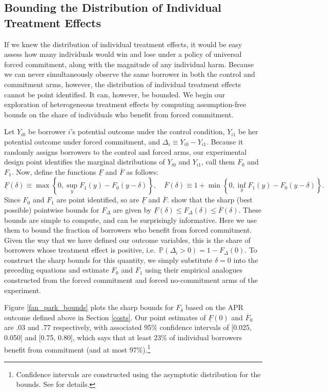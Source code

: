 \documentclass[oneside,11pt]{article}
\begin{document}
\subsection{Bounding the Distribution of Individual Treatment Effects}
\label{sec:bounds}
If we knew the distribution of individual treatment effects, it would be easy assess how many individuals would win and lose under a policy of universal forced commitment, along with the magnitude of any individual harm. 
Because we can never simultaneously observe the same borrower in both the control and commitment arms, however, the distribution of individual treatment effects cannot be point identified.
It can, however, be bounded.
We begin our exploration of heterogeneous treatment effects by computing assumption-free bounds on the share of individuals who benefit from forced commitment. 

Let $Y_{i0}$ be borrower $i$'s potential outcome under the control condition, $Y_{i1}$ be her potential outcome under forced commitment, and $\Delta_i \equiv Y_{i0} - Y_{i1}$.
Because it randomly assigns borrowers to the control and forced arms, our experimental design point identifies the marginal distributions of $Y_{i0}$ and $Y_{i1}$, call them $F_0$ and $F_1$.
Now, define the functions $\underline{F}$ and $\overline{F}$ as follows:
\[
\underline{F}(\delta) \equiv \max \left\{0, \sup_y F_1(y) - F_0(y - \delta)  \right\}, \quad
\overline{F}(\delta) \equiv 1 + \min \left\{0, \inf_y F_1(y) - F_0(y-\delta) \right\}.
\]
Since $F_0$ and $F_1$ are point identified, so are $\underline{F}$ and $\overline{F}$.
\cite{fan2010sharp} show that the sharp (best possible) pointwise bounds for $F_\Delta$ are given by $\underline{F}(\delta) \leq F_\Delta(\delta) \leq \overline{F}(\delta)$.
These bounds are simple to compute, and can be surprisingly informative. 
Here we use them to bound the fraction of borrowers who benefit from forced commitment. 
Given the way that we have defined our outcome variables, this is the share of borrowers whose treatment effect is positive, i.e.\ $\mathbb{P}(\Delta_i > 0) = 1 - F_\Delta(0)$. 
To construct the sharp bounds for this quantity, we simply substitute $\delta = 0$ into the preceding equations and estimate $F_0$ and $F_1$ using their empirical analogues constructed from the forced commitment and forced no-commitment arms of the experiment.

Figure \ref{fan_park_bounds} plots the sharp bounds for $F_{\delta}$ based on the APR outcome defined above in Section \ref{costs}. Our point estimates of $\underline{F}(0)$ and $\overline{F}_0$ are .03 and .77 respectively, with associated 95\% confidence intervals of [0.025, 0.050] and [0.75, 0.80], which says that at least 23\% of individual borrowers benefit from commitment (and at most 97\%).\footnote{Confidence intervals are constructed using the asymptotic distribution for the bounds. See \cite{fan2010sharp} for details.}
\end{document}
